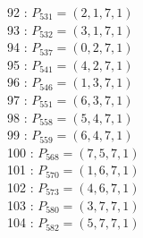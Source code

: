 \documentclass{article}
\begin{document}
{\begin{multicols}{3}
92 : $P_{531}=( 2, 1, 7, 1 )$\\
93 : $P_{532}=( 3, 1, 7, 1 )$\\
94 : $P_{537}=( 0, 2, 7, 1 )$\\
95 : $P_{541}=( 4, 2, 7, 1 )$\\
96 : $P_{546}=( 1, 3, 7, 1 )$\\
97 : $P_{551}=( 6, 3, 7, 1 )$\\
98 : $P_{558}=( 5, 4, 7, 1 )$\\
99 : $P_{559}=( 6, 4, 7, 1 )$\\
100 : $P_{568}=( 7, 5, 7, 1 )$\\
101 : $P_{570}=( 1, 6, 7, 1 )$\\
102 : $P_{573}=( 4, 6, 7, 1 )$\\
103 : $P_{580}=( 3, 7, 7, 1 )$\\
104 : $P_{582}=( 5, 7, 7, 1 )$\\
\end{multicols}


%


%


}%
\end{document}
